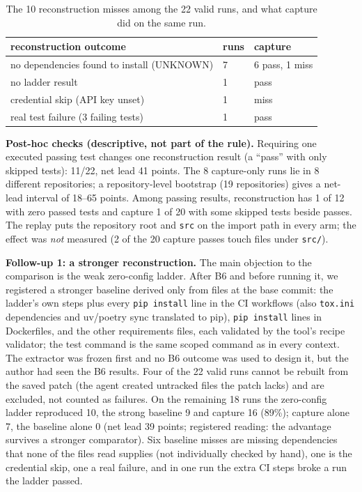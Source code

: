 \documentclass[10pt,conference]{IEEEtran}
\begin{document}
\begin{table}[h]
\centering\caption{The 10 reconstruction misses among the 22 valid runs, and what capture did on the same run.}
\begin{tabular}{p{4.1cm}p{1.5cm}p{1.3cm}}\toprule reconstruction outcome & runs & capture\\\midrule
no dependencies found to install (UNKNOWN) & 7 & 6 pass, 1 miss\\
no ladder result & 1 & pass\\
credential skip (API key unset) & 1 & miss\\
real test failure (3 failing tests) & 1 & pass\\\bottomrule\end{tabular}
\end{table}
\textbf{Post-hoc checks (descriptive, not part of the rule).} Requiring one executed passing test changes one reconstruction result (a ``pass'' with only skipped tests): 11/22, net lead 41 points. The 8 capture-only runs lie in 8 different repositories; a repository-level bootstrap (19 repositories) gives a net-lead interval of 18--65 points. Among passing results, reconstruction has 1 of 12 with zero passed tests and capture 1 of 20 with some skipped tests beside passes. The replay puts the repository root and \texttt{src} on the import path in every arm; the effect was \emph{not} measured (2 of the 20 capture passes touch files under \texttt{src/}).

\textbf{Follow-up 1: a stronger reconstruction.} The main objection to the comparison is the weak zero-config ladder. After B6 and before running it, we registered a stronger baseline derived only from files at the base commit: the ladder's own steps plus every \texttt{pip install} line in the CI workflows (also \texttt{tox.ini} dependencies and uv/poetry sync translated to pip), \texttt{pip install} lines in Dockerfiles, and the other requirements files, each validated by the tool's recipe validator; the test command is the same scoped command as in every context. The extractor was frozen first and no B6 outcome was used to design it, but the author had seen the B6 results. Four of the 22 valid runs cannot be rebuilt from the saved patch (the agent created untracked files the patch lacks) and are excluded, not counted as failures. On the remaining 18 runs the zero-config ladder reproduced 10, the strong baseline 9 and capture 16 (89\%); capture alone 7, the baseline alone 0 (net lead 39 points; registered reading: the advantage survives a stronger comparator). Six baseline misses are missing dependencies that none of the files read supplies (not individually checked by hand), one is the credential skip, one a real failure, and in one run the extra CI steps broke a run the ladder passed.
\end{document}
